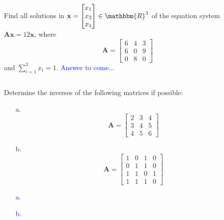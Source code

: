 \documentclass[a4paper,12pt]{article}
\newcommand{\R}{\mathbbm{R}}
\newcommand{\M}[1]{ \begin{bmatrix} #1 \end{bmatrix} }
\newcommand{\vecx}{\textbf{x}}
\newcommand{\matA}{\textbf{A}}
\begin{document}
\subsection{}
Find all solutions in $\vecx = \M{x_1\\x_2\\x_3} \in \R^3$ of the equation system $\matA \vecx = 12 \vecx$, where
$$\matA = \M{6&4&3\\6&0&9\\0&8&0}$$
and $\sum_{i=1}^3 x_i = 1$.
\textcolor{blue}{
Answer to come...
}
\subsection{}
Determine the inverses of the following matrices if possible:
\begin{itemize}
 \item [a.] $$\matA = \M{2&3&4\\3&4&5\\4&5&6}$$
 \item [b.] $$\matA = \M{1&0&1&0\\0&1&1&0\\1&1&0&1\\1&1&1&0}$$
\end{itemize}
\textcolor{blue}{
\begin{itemize}
 \item [a.]
 \item [b.]
\end{itemize}
}
\end{document}
